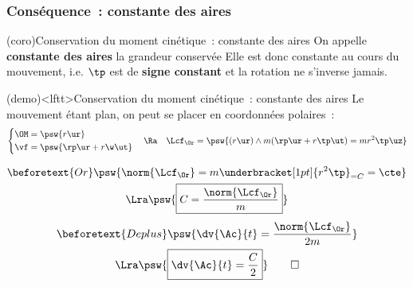 \documentclass[../../main/main.tex]{subfiles}
\begin{document}
\subsubsection{Conséquence~: constante des aires}
\begin{tcb*}(coro){Conservation du moment cinétique~: constante des aires}
	On appelle \textbf{constante des aires} la grandeur conservée
	\psw{
		\[
			\boxed{C = r^{2}\tp} \Lra \dv{\Ac}{t} = \frac{C}{2}
		\]
	}
	Elle est donc constante au cours du mouvement, i.e. $\tp$ est de \textbf{signe
		constant} et la rotation ne s'inverse jamais.
\end{tcb*}
\begin{tcb*}(demo)<lftt>{Conservation du moment cinétique~: constante des aires}
	Le mouvement étant plan, on peut se placer en coordonnées polaires~:
	\begin{gather*}
		\left\{
		\begin{aligned}
			\OM & = \psw{r\ur}            \\
			\vf & = \psw{\rp\ur + r\w\ut}
		\end{aligned}
		\right.
		\quad\Ra\quad
		\Lcf_{\Or} = \psw{(r\ur)\wedge m(\rp\ur+r\tp\ut) = mr^2\tp\uz}
	\end{gather*}
	\begin{isd}
		\vspace{-15pt}
		\begin{gather*}
			\beforetext{Or}
			\psw{\norm{\Lcf_{\Or}} = m \underbracket[1pt]{r^{2}\tp}_{=C} = \cte}
			\\\Lra
			\psw{\boxed{C = \frac{\norm{\Lcf_{\Or}}}{m}}}
		\end{gather*}
		\tcblower
		\vspace{-15pt}
		\begin{gather*}
			\beforetext{De plus}
			\psw{\dv{\Ac}{t} = \frac{\norm{\Lcf_{\Or}}}{2m}}
			\\\Lra
			\psw{\boxed{\dv{\Ac}{t} = \frac{C}{2}}}
			\qed
		\end{gather*}
	\end{isd}
\end{tcb*}

\end{document}
